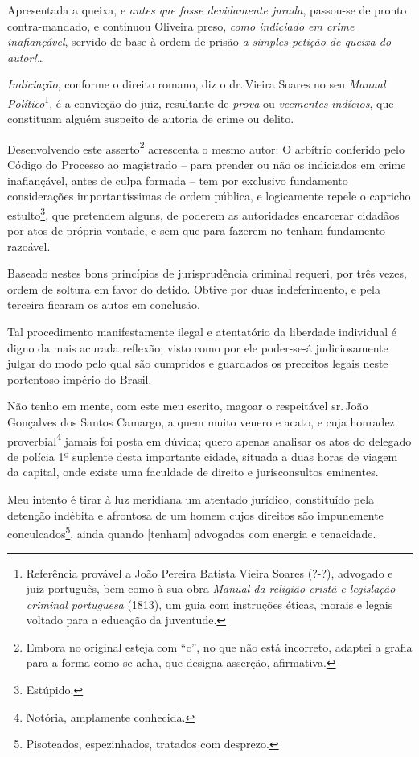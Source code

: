 Apresentada a queixa, e \emph{antes que fosse devidamente jurada},
passou-se de pronto contra-mandado, e continuou Oliveira preso,
\emph{como indiciado em crime inafiançável}, servido de base à ordem de
prisão \emph{a simples petição de queixa do autor!\ldots{}}

\emph{Indiciação}, conforme o direito romano, diz o dr.\,Vieira Soares no
seu \emph{Manual Político}\footnote{ Referência provável a João Pereira
  Batista Vieira Soares (?-?), advogado e juiz português, bem como à sua
  obra \emph{Manual da religião cristã e legislação criminal portuguesa}
  (1813), um guia com instruções éticas, morais e legais voltado para a
  educação da juventude.}, é a convicção do juiz, resultante de
\emph{prova} ou \emph{veementes} \emph{indícios}, que constituam alguém
suspeito de autoria de crime ou delito.

Desenvolvendo este asserto\footnote{ Embora no original esteja com ``c'',
  no que não está incorreto, adaptei a grafia para a forma como se acha,
  que designa asserção, afirmativa.} acrescenta o mesmo autor: O
arbítrio conferido pelo Código do Processo ao magistrado -- para prender
ou não os indiciados em crime inafiançável, antes de culpa formada --
tem por exclusivo fundamento considerações importantíssimas de ordem
pública, e logicamente repele o capricho estulto\footnote{ Estúpido.},
que pretendem alguns, de poderem as autoridades encarcerar cidadãos por
atos de própria vontade, e sem que para fazerem-no tenham fundamento
razoável.

Baseado nestes bons princípios de jurisprudência criminal requeri, por
três vezes, ordem de soltura em favor do detido. Obtive por duas
indeferimento, e pela terceira ficaram os autos em conclusão.

Tal procedimento manifestamente ilegal e atentatório da liberdade
individual é digno da mais acurada reflexão; visto como por ele
poder-se-á judiciosamente julgar do modo pelo qual são cumpridos e
guardados os preceitos legais neste portentoso império do Brasil.

Não tenho em mente, com este meu escrito, magoar o respeitável sr.\,João
Gonçalves dos Santos Camargo, a quem muito venero e acato, e cuja
honradez proverbial\footnote{ Notória, amplamente conhecida.} jamais
foi posta em dúvida; quero apenas analisar os atos do delegado de
polícia 1º suplente desta importante cidade, situada a duas horas de
viagem da capital, onde existe uma faculdade de direito e jurisconsultos
eminentes.

Meu intento é tirar à luz meridiana um atentado jurídico, constituído
pela detenção indébita e afrontosa de um homem cujos direitos são
impunemente conculcados\footnote{ Pisoteados, espezinhados, tratados
  com desprezo.}, ainda quando {[}tenham{]} advogados com energia e
tenacidade.

